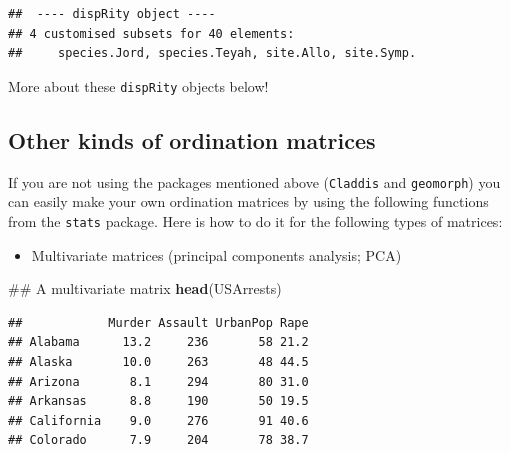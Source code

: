 \documentclass[]{book}
\newenvironment{Shaded}{\begin{snugshade}}{\end{snugshade}}
\newcommand{\KeywordTok}[1]{\textcolor[rgb]{0.13,0.29,0.53}{\textbf{#1}}}
\newcommand{\DataTypeTok}[1]{\textcolor[rgb]{0.13,0.29,0.53}{#1}}
\newcommand{\StringTok}[1]{\textcolor[rgb]{0.31,0.60,0.02}{#1}}
\newcommand{\OperatorTok}[1]{\textcolor[rgb]{0.81,0.36,0.00}{\textbf{#1}}}
\newcommand{\NormalTok}[1]{#1}
\providecommand{\tightlist}{%
  \setlength{\itemsep}{0pt}\setlength{\parskip}{0pt}}
\theoremstyle{definition}
\theoremstyle{definition}
\theoremstyle{remark}
\begin{document}
\begin{Shaded}
\end{Shaded}

\begin{verbatim}
##  ---- dispRity object ---- 
## 4 customised subsets for 40 elements:
##     species.Jord, species.Teyah, site.Allo, site.Symp.
\end{verbatim}

More about these \texttt{dispRity} objects below!

\subsection{Other kinds of ordination
matrices}\label{other-kinds-of-ordination-matrices}

If you are not using the packages mentioned above (\texttt{Claddis} and
\texttt{geomorph}) you can easily make your own ordination matrices by
using the following functions from the \texttt{stats} package. Here is
how to do it for the following types of matrices:

\begin{itemize}
\tightlist
\item
  Multivariate matrices (principal components analysis; PCA)
\end{itemize}

\begin{Shaded}
\begin{Highlighting}[]
\NormalTok{## A multivariate matrix}
\KeywordTok{head}\NormalTok{(USArrests)}
\end{Highlighting}
\end{Shaded}

\begin{verbatim}
##            Murder Assault UrbanPop Rape
## Alabama      13.2     236       58 21.2
## Alaska       10.0     263       48 44.5
## Arizona       8.1     294       80 31.0
## Arkansas      8.8     190       50 19.5
## California    9.0     276       91 40.6
## Colorado      7.9     204       78 38.7
\end{verbatim}
\end{document}
